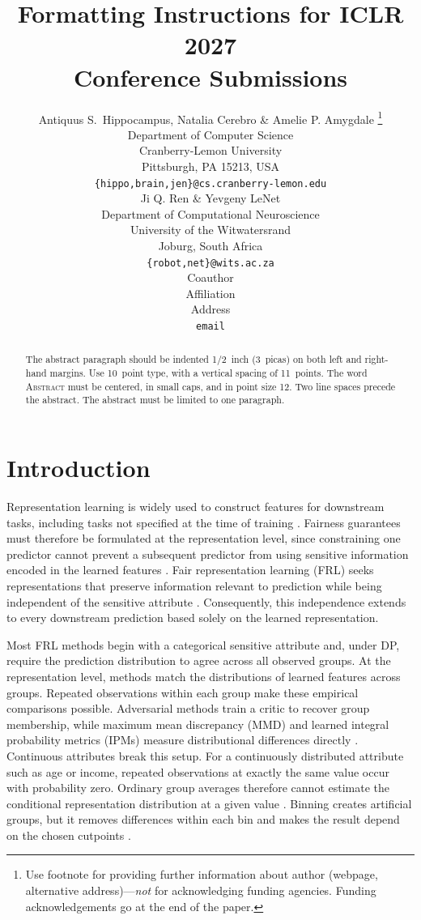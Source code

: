 \documentclass{article} %
\title{Formatting Instructions for ICLR 2027 \\ Conference Submissions}
\author{Antiquus S.~Hippocampus, Natalia Cerebro \& Amelie P. Amygdale \thanks{ Use footnote for providing further information
about author (webpage, alternative address)---\emph{not} for acknowledging
funding agencies.  Funding acknowledgements go at the end of the paper.} \\
Department of Computer Science\\
Cranberry-Lemon University\\
Pittsburgh, PA 15213, USA \\
\texttt{\{hippo,brain,jen\}@cs.cranberry-lemon.edu} \\
\And
Ji Q. Ren \& Yevgeny LeNet \\
Department of Computational Neuroscience \\
University of the Witwatersrand \\
Joburg, South Africa \\
\texttt{\{robot,net\}@wits.ac.za} \\
\AND
Coauthor \\
Affiliation \\
Address \\
\texttt{email}
}
\begin{document}
\maketitle

\begin{abstract}
The abstract paragraph should be indented 1/2~inch (3~picas) on both left and
right-hand margins. Use 10~point type, with a vertical spacing of 11~points.
The word \textsc{Abstract} must be centered, in small caps, and in point size 12. Two
line spaces precede the abstract. The abstract must be limited to one
paragraph.
\end{abstract}

\section{Introduction}

Representation learning is widely used to construct features for downstream tasks, including tasks not specified at the time of training \citep{bengio2013representation}.  Fairness guarantees must therefore be formulated at the representation level, since constraining one predictor cannot prevent a subsequent predictor from using sensitive information encoded in the learned features \citep{madras2018adversarially}.  Fair representation learning (FRL) seeks representations that preserve information relevant to prediction while being independent of the sensitive attribute \citep{zemel2013learning}.  Consequently, this independence extends to every downstream prediction based solely on the learned representation.

Most FRL methods begin with a categorical sensitive attribute and, under DP, require the prediction distribution to agree across all observed groups.  At the representation level, methods match the distributions of learned features across groups.  Repeated observations within each group make these empirical comparisons possible.  Adversarial methods train a critic to recover group membership, while maximum mean discrepancy (MMD) and learned integral probability metrics (IPMs) measure distributional differences directly \citep{edwards2016censoring,louizos2016variational,madras2018adversarially,kim2022parametric,deka2023mmdbfair}.  Continuous attributes break this setup.  For a continuously distributed attribute such as age or income, repeated observations at exactly the same value occur with probability zero.  Ordinary group averages therefore cannot estimate the conditional representation distribution at a given value \citep{mary2019continuous,kong2025fair}.  Binning creates artificial groups, but it removes differences within each bin and makes the result depend on the chosen cutpoints \citep{mary2019continuous,kong2025fair}.
\end{document}

